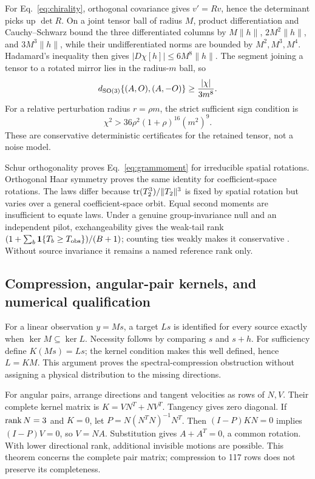 For Eq.~\eqref{eq:chirality}, orthogonal covariance gives $v'=Rv$, hence the determinant picks up $\det R$. On a joint tensor ball of radius $M$, product differentiation and Cauchy--Schwarz bound the three differentiated columns by $M\|h\|$, $2M^2\|h\|$, and $3M^3\|h\|$, while their undifferentiated norms are bounded by $M^2,M^3,M^4$. Hadamard's inequality then gives $|D\chi[h]|\leq6M^8\|h\|$. The segment joining a tensor to a rotated mirror lies in the radius-$m$ ball, so
\begin{equation}
 d_{\mathrm{SO}(3)}\{(A,O),(A,-O)\}\geq\frac{|\chi|}{3m^8}.
\end{equation}
For a relative perturbation radius $r=\rho m$, the strict sufficient sign condition is
\begin{equation}
 \chi^2>36\rho^2(1+\rho)^{16}(m^2)^9.
\end{equation}
These are conservative deterministic certificates for the retained tensor, not a noise model.

Schur orthogonality proves Eq.~\eqref{eq:grammoment} for irreducible spatial rotations. Orthogonal Haar symmetry proves the same identity for coefficient-space rotations. The laws differ because $\operatorname{tr}(T_2^3)/\|T_2\|^3$ is fixed by spatial rotation but varies over a general coefficient-space orbit. Equal second moments are insufficient to equate laws. Under a genuine group-invariance null and an independent pilot, exchangeability gives the weak-tail rank $(1+\sum_b\mathbf 1\{T_b\geq T_{\rm obs}\})/(B+1)$; counting ties weakly makes it conservative \cite{HemerikGoeman2018}. Without source invariance it remains a named reference rank only.

\subsection{Compression, angular-pair kernels, and numerical qualification}

For a linear observation $y=Ms$, a target $Ls$ is identified for every source exactly when $\ker M\subseteq\ker L$. Necessity follows by comparing $s$ and $s+h$. For sufficiency define $K(Ms)=Ls$; the kernel condition makes this well defined, hence $L=KM$. This argument proves the spectral-compression obstruction without assigning a physical distribution to the missing directions.

For angular pairs, arrange directions and tangent velocities as rows of $N,V$. Their complete kernel matrix is $K=VN^T+NV^T$. Tangency gives zero diagonal. If $\operatorname{rank} N=3$ and $K=0$, let $P=N(N^TN)^{-1}N^T$. Then $(I-P)KN=0$ implies $(I-P)V=0$, so $V=NA$. Substitution gives $A+A^T=0$, a common rotation. With lower directional rank, additional invisible motions are possible. This theorem concerns the complete pair matrix; compression to 117 rows does not preserve its completeness.


